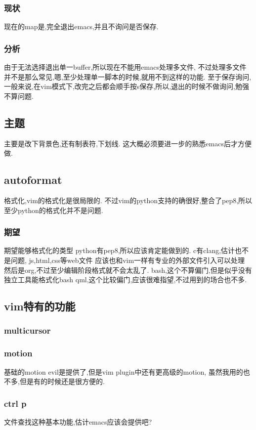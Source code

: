 \documentclass[12pt,a4paper]{article}
\begin{document}
\subsubsection{现状}
\label{sec:orgheadline14}
现在的map是,完全退出emacs,并且不询问是否保存.
\subsubsection{分析}
\label{sec:orgheadline15}
由于无法选择退出单一buffer,所以现在不能用emacs处理多文件,
不过处理多文件并不是那么常见,嗯,至少处理单一脚本的时候,就用不到这样的功能.
至于保存询问,一般来说,在vim模式下,改完之后都会顺手按s保存,所以,退出的时候不做询问,勉强不算问题.
\subsection{主题}
\label{sec:orgheadline17}
主要是改下背景色,还有制表符,下划线.
这大概必须要进一步的熟悉emacs后才方便做.
\subsection{autoformat}
\label{sec:orgheadline19}
格式化,vim的格式化是很局限的.
不过vim的python支持的确很好,整合了pep8,所以至少python的格式化并不是问题.
\subsubsection{期望}
\label{sec:orgheadline18}
    期望能够格式化的类型
python有pep8,所以应该肯定能做到的.
c有clang,估计也不是问题,
js,html,css等web文件
应该也和vim一样有专业的外部文件引入可以处理
然后是org,不过至少编辑阶段格式就不会太乱了.
bash,这个不算偏门,但是似乎没有独立工具能格式化bash
qml,这个比较偏门,应该很难指望,不过用到的场合也不多.
\subsection{vim特有的功能}
\label{sec:orgheadline24}
\subsubsection{multicursor}
\label{sec:orgheadline20}
\subsubsection{motion}
\label{sec:orgheadline21}
基础的motion evil是提供了,但是vim plugin中还有更高级的motion,
虽然我用的也不多,但是有的时候还是很方便的.
\subsubsection{ctrl p}
\label{sec:orgheadline22}
文件查找这种基本功能,估计emacs应该会提供吧?
\end{document}
